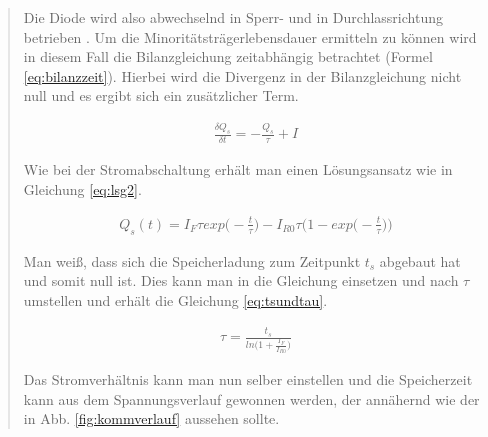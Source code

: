 \begin{quote}
	\vspace{2em}

	Die Diode wird also abwechselnd in Sperr- und in Durchlassrichtung betrieben
	. Um die Minoritätsträgerlebensdauer ermitteln zu können wird in diesem Fall
	die Bilanzgleichung zeitabhängig betrachtet (Formel \ref{eq:bilanzzeit}).
	Hierbei wird die Divergenz in der Bilanzgleichung nicht null und es ergibt
	sich ein zusätzlicher Term.

	\begin{equation}
         \begin{split}
            \frac{\delta Q_{s}}{\delta t}=-\frac{Q_{s}}{\tau}+I
             \end{split}
         \label{eq:bilanzzeit}
    \end{equation}

    Wie bei der Stromabschaltung erhält man einen Lösungsansatz wie in Gleichung
    \ref{eq:lsg2}.

	\begin{equation}
         \begin{split}
             Q_{s}(t)=I_{F}\tau exp\Big(-\frac{t}{\tau}\Big)-I_{R0}\tau\Big(1-exp\Big(-\frac{t}{\tau}\Big)\Big)
             \end{split}
         \label{eq:lsg2}
    \end{equation}

	Man weiß, dass sich die Speicherladung zum Zeitpunkt $t_s$ abgebaut hat und
	somit null ist. Dies kann man in die Gleichung einsetzen und nach $\tau$
    umstellen und erhält die Gleichung \ref{eq:tsundtau}.

	\begin{equation}
         \begin{split}
             \tau= \frac{t_s}{ln\Big(1+\frac{I_F}{I_{R0}}\Big)}
             \end{split}
         \label{eq:tsundtau}
    \end{equation}

    Das Stromverhältnis kann man nun selber einstellen und die Speicherzeit kann
    aus dem Spannungsverlauf gewonnen werden, der annähernd wie der in Abb.
    \ref{fig:kommverlauf} aussehen sollte.

	\vspace{2em}


\end{quote}
